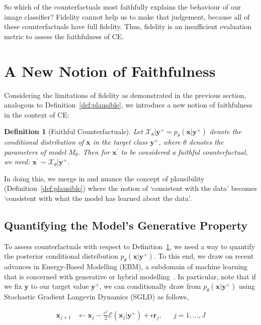 \documentclass{article}
\newtheorem{definition}{Definition}[section]
\begin{document}
So which of the counterfactuals most faithfully explains the behaviour of our image classifier? Fidelity cannot help us to make that judgement, because all of these counterfactuals have full fidelity. Thus, fidelity is an insufficient evaluation metric to assess the faithfulness of CE. 

\section{A New Notion of Faithfulness}\label{faithfulness}

Considering the limitations of fidelity as demonstrated in the previous section, analogous to Definition~\ref{def:plausible}, we introduce a new notion of faithfulness in the context of CE:

\begin{definition}[Faithful Counterfactuals]
  \label{def:faithful}
  Let $\mathcal{X}_{\theta}|\mathbf{y}^+ = p_{\theta}(\mathbf{x}|\mathbf{y}^+)$ denote the conditional distribution of $\mathbf{x}$ in the target class $\mathbf{y}^+$, where $\theta$ denotes the parameters of model $M_{\theta}$. Then for $\mathbf{x}^{\prime}$ to be considered a faithful counterfactual, we need: $\mathbf{x}^{\prime} \sim \mathcal{X}_{\theta}|\mathbf{y}^+$.
\end{definition}

In doing this, we merge in and nuance the concept of plausibility (Definition~\ref{def:plausible}) where the notion of `consistent with the data' becomes `consistent with what the model has learned about the data'.

\subsection{Quantifying the Model's Generative Property}

To assess counterfactuals with respect to Definition~\ref{def:faithful}, we need a way to quantify the posterior conditional distribution $p_{\theta}(\mathbf{x}|\mathbf{y}^+)$. To this end, we draw on recent advances in Energy-Based Modelling (EBM), a subdomain of machine learning that is concerned with generative or hybrid modelling~\citep{grathwohl2020your,du2020implicit}. In particular, note that if we fix $\mathbf{y}$ to our target value $\mathbf{y}^+$, we can conditionally draw from $p_{\theta}(\mathbf{x}|\mathbf{y}^+)$ using Stochastic Gradient Langevin Dynamics (SGLD) as follows, 

\begin{equation}\label{eq:sgld}
  \begin{aligned}
    \mathbf{x}_{j+1} &\leftarrow \mathbf{x}_j - \frac{\epsilon^2}{2} \mathcal{E}(\mathbf{x}_j|\mathbf{y}^+) + \epsilon \mathbf{r}_j, && j=1,...,J
  \end{aligned}
\end{equation}
\end{document}
